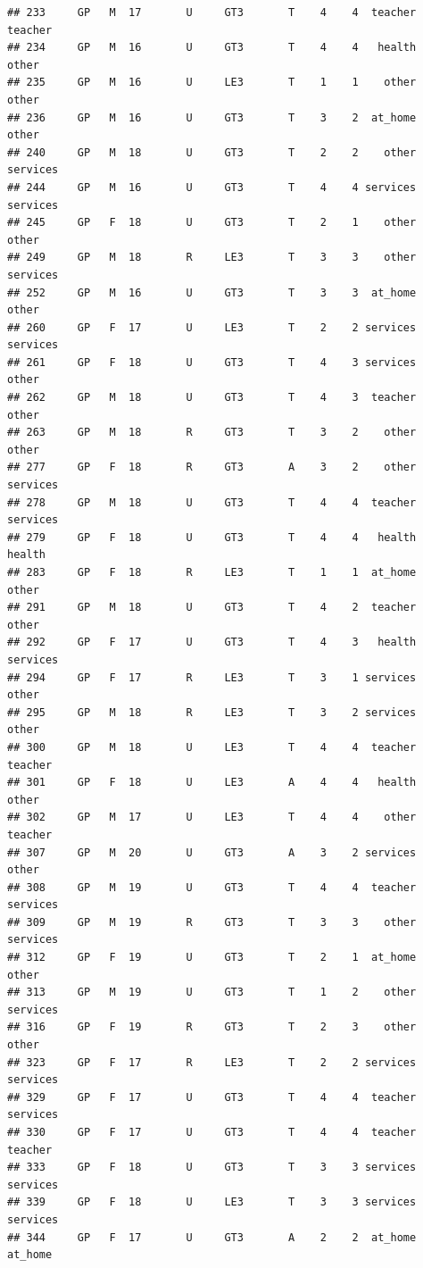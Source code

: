 \documentclass[
]{article}
\begin{document}
\begin{verbatim}
## 233     GP   M  17       U     GT3       T    4    4  teacher  teacher
## 234     GP   M  16       U     GT3       T    4    4   health    other
## 235     GP   M  16       U     LE3       T    1    1    other    other
## 236     GP   M  16       U     GT3       T    3    2  at_home    other
## 240     GP   M  18       U     GT3       T    2    2    other services
## 244     GP   M  16       U     GT3       T    4    4 services services
## 245     GP   F  18       U     GT3       T    2    1    other    other
## 249     GP   M  18       R     LE3       T    3    3    other services
## 252     GP   M  16       U     GT3       T    3    3  at_home    other
## 260     GP   F  17       U     LE3       T    2    2 services services
## 261     GP   F  18       U     GT3       T    4    3 services    other
## 262     GP   M  18       U     GT3       T    4    3  teacher    other
## 263     GP   M  18       R     GT3       T    3    2    other    other
## 277     GP   F  18       R     GT3       A    3    2    other services
## 278     GP   M  18       U     GT3       T    4    4  teacher services
## 279     GP   F  18       U     GT3       T    4    4   health   health
## 283     GP   F  18       R     LE3       T    1    1  at_home    other
## 291     GP   M  18       U     GT3       T    4    2  teacher    other
## 292     GP   F  17       U     GT3       T    4    3   health services
## 294     GP   F  17       R     LE3       T    3    1 services    other
## 295     GP   M  18       R     LE3       T    3    2 services    other
## 300     GP   M  18       U     LE3       T    4    4  teacher  teacher
## 301     GP   F  18       U     LE3       A    4    4   health    other
## 302     GP   M  17       U     LE3       T    4    4    other  teacher
## 307     GP   M  20       U     GT3       A    3    2 services    other
## 308     GP   M  19       U     GT3       T    4    4  teacher services
## 309     GP   M  19       R     GT3       T    3    3    other services
## 312     GP   F  19       U     GT3       T    2    1  at_home    other
## 313     GP   M  19       U     GT3       T    1    2    other services
## 316     GP   F  19       R     GT3       T    2    3    other    other
## 323     GP   F  17       R     LE3       T    2    2 services services
## 329     GP   F  17       U     GT3       T    4    4  teacher services
## 330     GP   F  17       U     GT3       T    4    4  teacher  teacher
## 333     GP   F  18       U     GT3       T    3    3 services services
## 339     GP   F  18       U     LE3       T    3    3 services services
## 344     GP   F  17       U     GT3       A    2    2  at_home  at_home

\end{verbatim}
\end{document}
